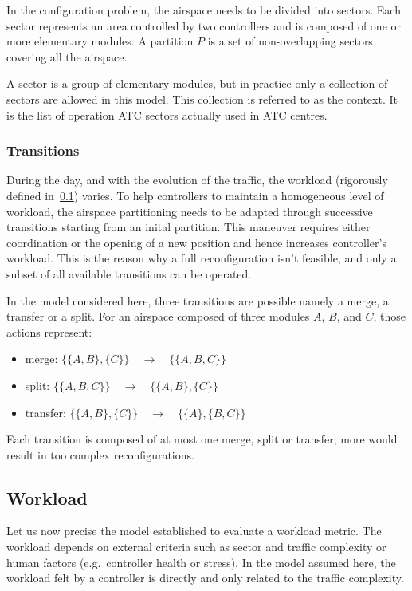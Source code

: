 \documentclass[oneside,twocolumn]{article}
\begin{document}
In the configuration problem, the airspace needs to be divided into sectors. Each
sector represents an area controlled by two controllers and is composed of
one or more elementary modules. A partition $P$ is a set of
non-overlapping sectors covering all the airspace.

A sector is a group of elementary modules, but in practice only a collection
of sectors are allowed in this model. This collection is referred to as the
context. It is the list of operation ATC sectors actually used in ATC centres.

\subsubsection{Transitions}\label{sssec:transitions}

During the day, and with the evolution of the traffic, the workload (rigorously
defined in~\ref{sub:workload}) varies. To help controllers to maintain a
homogeneous level of workload, the airspace partitioning needs to be adapted
through successive transitions starting from an inital partition.
This maneuver requires either coordination or the opening of a new position
and hence increases controller's workload.
This is the reason why a full reconfiguration isn't feasible, and
only a subset of all available transitions can be operated.

In the model considered here, three transitions are possible namely a merge,
a transfer
or a split. For an airspace composed of three modules $A$, $B$, and $C$,
those actions represent:
\begin{itemize}
  \item merge: $\{\{A, B\}, \{C\}\} \quad \rightarrow \quad \{\{A, B, C\}\}$
  \item split: $\{\{A, B, C\}\} \quad \rightarrow \quad \{\{A, B\}, \{C\}\}$
  \item transfer: $\{\{A, B\}, \{C\}\} \quad \rightarrow \quad \{\{A\}, \{B, C\}\}$
\end{itemize}

Each transition is composed of at most one merge, split or transfer; more would
result in too complex reconfigurations.

\subsection{Workload}\label{sub:workload}

Let us now precise the model established to evaluate a workload metric. The
workload depends on external criteria such as sector and traffic complexity
or human factors (e.g.\ controller health or stress). In the model assumed here,
the workload felt by a controller is directly and only related to the traffic
complexity.
\end{document}
